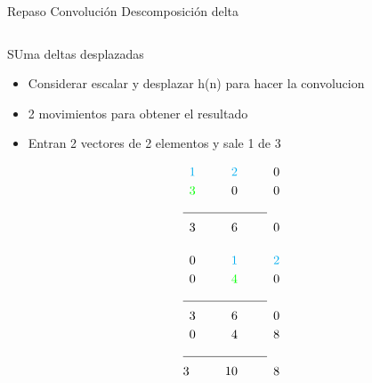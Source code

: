 \begin{frame}{Repaso Convolución }{Descomposición delta}
   \begin{columns}[c]
      \begin{column}{0.4\textwidth}
         \tiny
         SUma deltas desplazadas
         \begin{itemize}
            \item{Considerar escalar y desplazar h(n) para hacer la convolucion}
            \item{2 movimientos para obtener el resultado}
            \item{Entran 2 vectores de 2 elementos y sale 1 de 3}
         \end{itemize}
         \begin{align*}
            \textcolor{cyan} {1} \hspace{1cm}\textcolor{cyan}{2} \hspace{1cm}0\\
            \textcolor{green}{3} \hspace{1cm}                 0  \hspace{1cm}0\\
            \cline{1-2}
            3\hspace{1cm} 6 \hspace{1cm}0\\[0.4cm]
            0\hspace{1cm}\textcolor{cyan} {1} \hspace{1cm}\textcolor{cyan}{2}\\
            0\hspace{1cm}\textcolor{green}{4} \hspace{1cm}                 0\\
            \cline{1-2}
            3\hspace{1cm} 6 \hspace{1cm}0\\
            0\hspace{1cm} 4 \hspace{1cm}8\\
            \cline{1-2}
            3 \hspace{1cm}10 \hspace{1cm} 8\\
         \end{align*}
      \end{column}
      \hspace{2pt}

\end{columns}
\end{frame}
